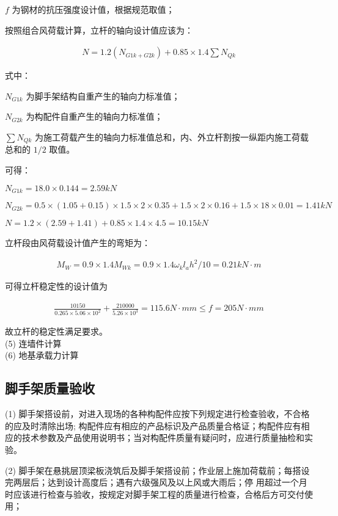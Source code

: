 $f$ 为钢材的抗压强度设计值，根据规范取值；

按照组合风荷载计算，立杆的轴向设计值应该为：

\begin{align}
    N=1.2(N_{G1k+G2k})+0.85\times 1.4\sum N_{Qk}
\end{align}

式中：

$N_{G1k}$ 为脚手架结构自重产生的轴向力标准值； 

$N_{G2k}$ 为构配件自重产生的轴向力标准值；

$\sum N_{Qk}$ 为施工荷载产生的轴向力标准值总和，内、外立杆割按一纵距内施工荷载
总和的 $1/2$ 取值。

可得：

$N_{G1k}=18.0\times 0.144=2.59 kN$

$N_{G2k}=0.5\times (1.05+0.15)\times 1.5\times 2\times 0.35+1.5\times 2\times 0.16+1.5\times 18\times 0.01=1.41 kN$

$N=1.2\times (2.59+1.41)+0.85\times 1.4\times 4.5=10.15 kN$

立杆段由风荷载设计值产生的弯矩为：

\begin{align}
    M_W=0.9\times 1.4M_{Wk}=0.9\times 1.4\omega _kl_ah^2/10=0.21kN\cdot m
\end{align}

可得立杆稳定性的设计值为

\begin{align}
    \frac{10150}{0.265×5.06×10^2}+\frac{210000}{5.26×10^3}=115.6 N\cdot mm \leq f=205 N\cdot mm
\end{align}

故立杆的稳定性满足要求。\\

(5) 连墙件计算\\

(6) 地基承载力计算\\

\subsection{脚手架质量验收}

(1) 脚手架搭设前，对进入现场的各种构配件应按下列规定进行检查验收，不合格的应及时清除出场;
构配件应有相应的产品标识及产品质量合格证；构配件应有相应的技术参数及产品使用说明书；当对构配件质量有疑问时，应进行质量抽检和实
验。

(2) 脚手架在悬挑层顶梁板浇筑后及脚手架搭设前；作业层上施加荷载前；每搭设完两层后；达到设计高度后；遇有六级强风及以上风或大雨后；停
用超过一个月时应该进行检查与验收，按规定对脚手架工程的质量进行检查，合格后方可交付使用；

